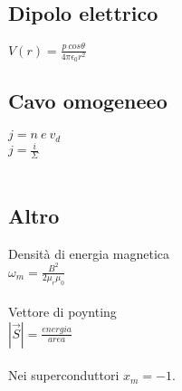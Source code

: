 \documentclass[../../main.tex]{subfiles}
\begin{document}
\subsection*{Dipolo elettrico}
$V(r) = \frac{p\ cos\theta}{4\pi\epsilon_0 r^2}$\\

\subsection*{Cavo omogeneeo}
$j = n\ e\ v_d $\\
$j = \frac{i}{\Sigma}$\\\\


\subsection*{Altro}
Densità di energia magnetica \\
$\omega_m = \frac{B^2}{2\mu_r \mu_0}$\\\\

Vettore di poynting\\
$|\vec{S}| = \frac{energia}{area}$\\\\


Nei superconduttori $x_m = -1$.\\
\newpage
\end{document}
